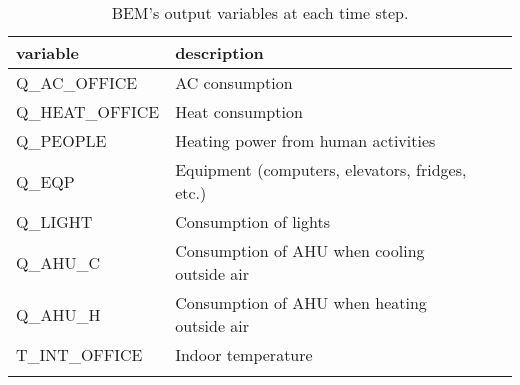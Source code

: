\begin{table}
	\centering
	\begin{tabular}{@{}llll@{}}
		variable        & description                                     \\ \midrule
		Q\_AC\_OFFICE   & AC consumption                                  \\
		Q\_HEAT\_OFFICE & Heat consumption                                \\
		Q\_PEOPLE       & Heating power from human activities             \\
		Q\_EQP          & Equipment (computers, elevators, fridges, etc.) \\
		Q\_LIGHT        & Consumption of lights                           \\
		Q\_AHU\_C       & Consumption of AHU when cooling outside air     \\
		Q\_AHU\_H       & Consumption of AHU when heating outside air     \\
		T\_INT\_OFFICE  & Indoor temperature                              \\
		\bottomrule                                                       \\
	\end{tabular}
	\caption{BEM's output variables at each time step.}
	\label{tab:output_variables}

\end{table}



